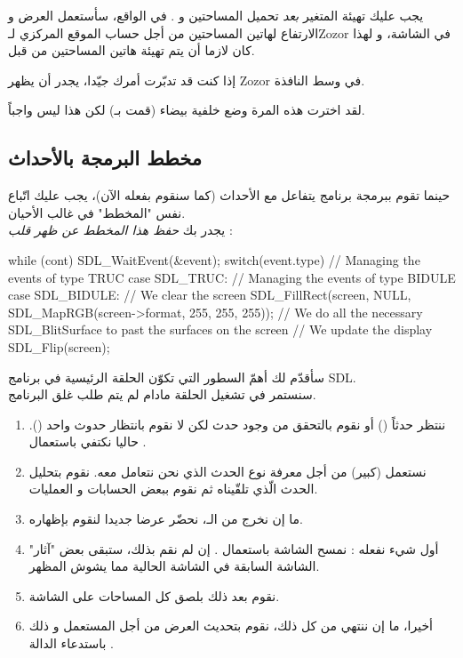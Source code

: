 \begin{critical}
يجب عليك تهيئة المتغير 
\textit{بعد}
تحميل المساحتين 
و 
.
في الواقع، سأستعمل العرض 
و الارتفاع 
لهاتين المساحتين من أجل حساب الموقع المركزي لـ\textenglish{Zozor}
في الشاشة، و لهذا كان لازما أن يتم تهيئة هاتين المساحتين من قبل.
\end{critical}

إذا كنت قد تدبّرت أمرك جيّدا، يجدر أن يظهر 
\textenglish{Zozor}
في وسط النافذة.


لقد اخترت هذه المرة وضع خلفية بيضاء (قمت بـ)
لكن هذا ليس واجباً.

\subsection{مخطط البرمجة بالأحداث}

حينما تقوم ببرمجة برنامج يتفاعل مع الأحداث (كما سنقوم بفعله الآن)، يجب عليك اتّباع نفس "المخطط" في غالب الأحيان.\\
يجدر بك 
\textit{حفظ هذا المخطط عن ظهر قلب} :

\begin{Csource}
while (cont)
{
	SDL_WaitEvent(&event);
	switch(event.type)
	{
		// Managing the events of type TRUC
		case SDL_TRUC: 
		// Managing the events of type BIDULE
		case SDL_BIDULE:
	}
	// We clear the screen
	SDL_FillRect(screen, NULL, SDL_MapRGB(screen->format, 255, 255, 255)); 
	// We do all the necessary SDL_BlitSurface to past the surfaces on the screen
	// We update the display
	SDL_Flip(screen);
}
\end{Csource}

سأقدّم لك أهمّ السطور التي تكوّن الحلقة الرئيسية في برنامج 
\textenglish{SDL}.\\
سنستمر في تشغيل الحلقة مادام لم يتم طلب غلق البرنامج.

\begin{enumerate}
	\item ننتظر حدثاً
	()
	أو نقوم بالتحقق من وجود حدث لكن لا نقوم بانتظار حدوث واحد 
	().
	حاليا نكتفي باستعمال 
	.
	\item نستعمل 
	(كبير) من أجل معرفة نوع الحدث الذي نحن نتعامل معه. نقوم بتحليل الحدث الّذي تلقّيناه ثم نقوم ببعض الحسابات و العمليات.
	\item ما إن نخرج من الـ،
	نحضّر عرضا جديدا لنقوم بإظهاره.
	\item أول شيء نفعله : نمسح الشاشة باستعمال
	.
	إن لم نقم بذلك، ستبقى بعض "آثار" الشاشة السابقة في الشاشة الحالية مما يشوش المظهر.
	\item نقوم بعد ذلك بلصق كل المساحات على الشاشة.
	\item أخيرا، ما إن ننتهي من كل ذلك، نقوم بتحديث العرض من أجل المستعمل و ذلك باستدعاء الدالة
	.
\end{enumerate}

